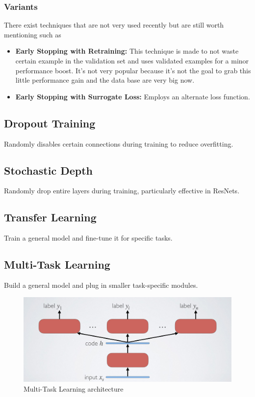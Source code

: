 \documentclass{article}
\begin{document}
\subsubsection{Variants}
There exist techniques that are not very used recently but are still worth mentioning such as

\begin{itemize}
\item \textbf{Early Stopping with Retraining:} This technique is made to not waste certain example in the validation set and uses validated examples for a minor performance boost. It's not very popular because it's not the goal to grab this little performance gain and the data base are very big now.
\item \textbf{Early Stopping with Surrogate Loss:} Employs an alternate loss function.
\end{itemize}

\subsection{Dropout Training}
Randomly disables certain connections during training to reduce overfitting.

\subsection{Stochastic Depth}
Randomly drop entire layers during training, particularly effective in ResNets.

\subsection{Transfer Learning}
Train a general model and fine-tune it for specific tasks.

\subsection{Multi-Task Learning}
Build a general model and plug in smaller task-specific modules.
\begin{figure}[ht]
    \centering
    \includegraphics[width=\linewidth]{graphics/S4Regularisation/multitask-learning.jpg}
    \caption{Multi-Task Learning architecture}
    \label{fig:multitask-learning}
\end{figure}
\end{document}
